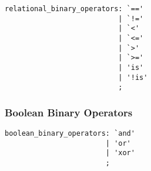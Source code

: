 \documentclass{article}
\begin{document}
\begin{lstlisting}
relational_binary_operators: `=='
                           | `!='
                           | `<'
                           | `<='
                           | `>'
                           | `>='
                           | 'is'
                           | '!is'
                           ;
\end{lstlisting}

\subsubsection{Boolean Binary Operators}

\begin{lstlisting}
boolean_binary_operators: `and'
                        | 'or'
                        | 'xor'
                        ;
\end{lstlisting}
\end{document}
